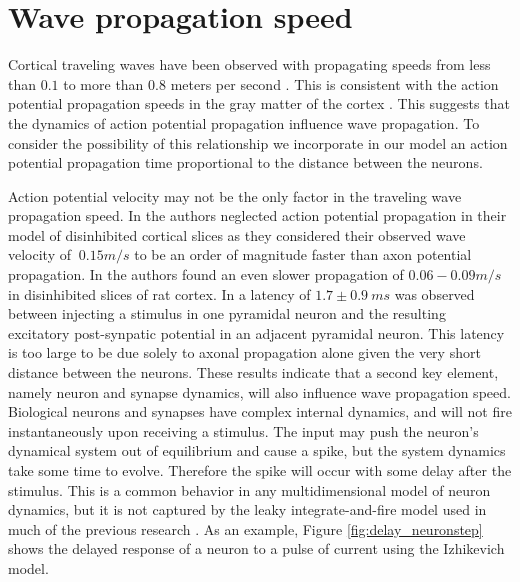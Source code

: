 \section{Wave propagation speed} \label{sub:propagation_speed}
Cortical traveling waves have been observed with propagating speeds from less than $0.1$ to more than $0.8$ meters per second \citet{Sato2012}\citet{Golomb1997}\citet{Chervin1988}.
This is consistent with the action potential propagation speeds in the gray matter of the cortex \citet{Muller2018}. 
This suggests that the dynamics of action potential propagation influence wave propagation. 
To consider the possibility of this relationship we incorporate in our model an action potential propagation time proportional to the distance between the neurons.

Action potential velocity may not be the only factor in the traveling wave propagation speed.
In \citet{Golomb1997} the authors neglected action potential propagation in their model of disinhibited cortical slices as they considered their observed wave velocity of $~0.15 m/s$ to be an order of magnitude faster than axon potential propagation.
In \citet{Chervin1988} the authors found an even slower propagation of $0.06-0.09 m/s$ in disinhibited slices of rat cortex.
In  \citet{Markram1997} a latency of $1.7\pm 0.9\ ms$ was observed between injecting a stimulus in one pyramidal neuron and the resulting excitatory post-synpatic potential in an adjacent pyramidal neuron.
This latency is too large to be due solely to axonal propagation alone given the very short distance between the neurons. 
These results indicate that a second key element, namely neuron and synapse dynamics, will also influence wave propagation speed.
Biological neurons and synapses  have complex internal dynamics, and will not fire instantaneously upon receiving a stimulus.
The input may push the neuron's dynamical system out of equilibrium and cause a spike, but the system dynamics take some time to evolve.
Therefore the spike will occur with some delay after the stimulus.
This is a common behavior in any multidimensional model of neuron dynamics, but it is not captured by the leaky integrate-and-fire model used in much of the previous research \citet{keane2015}\citet{Senk2020}.
As an example, Figure \ref{fig:delay_neuronstep} shows the delayed response of a neuron to a pulse of current using the Izhikevich model.
